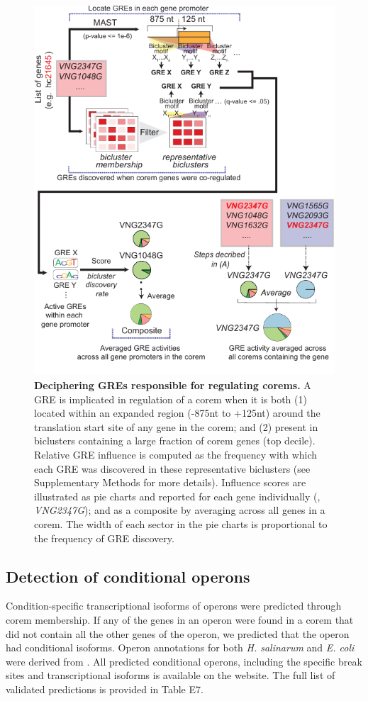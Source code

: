 \begin{figure}[h!]
\centering
\includegraphics[width=0.7\linewidth]{figures/corem_gres.pdf}
\caption[Deciphering GREs responsible for regulating corems]{\textbf{Deciphering GREs responsible for regulating corems.} A GRE is implicated in regulation of a corem when it is both (1) located within an expanded region (-875nt to +125nt) around the translation start site of any gene in the corem; and (2) present in biclusters containing a large fraction of corem genes (top decile). Relative GRE influence is computed as the frequency with which each GRE was discovered in these representative biclusters (see Supplementary Methods for more details). Influence scores are illustrated as pie charts and reported for each gene individually (\eg, \textit{VNG2347G}); and as a composite by averaging across all genes in a corem. The width of each sector in the pie charts is proportional to the frequency of GRE discovery.}
\label{fig:corem_gres}
\end{figure}

\subsection{Detection of conditional operons}
\label{section:condop}
Condition-specific transcriptional isoforms of operons were predicted
through corem membership. If any of the genes in an operon were found
in a corem that did not contain all the other genes of the operon, we
predicted that the operon had conditional isoforms. Operon annotations
for both {\it H. salinarum} and {\it E. coli} were derived from
 \cite{Alm2005,Price2005b}. All predicted conditional
operons, including the specific break sites and transcriptional
isoforms is available on the website. The full list of validated
predictions is provided in Table E7.


